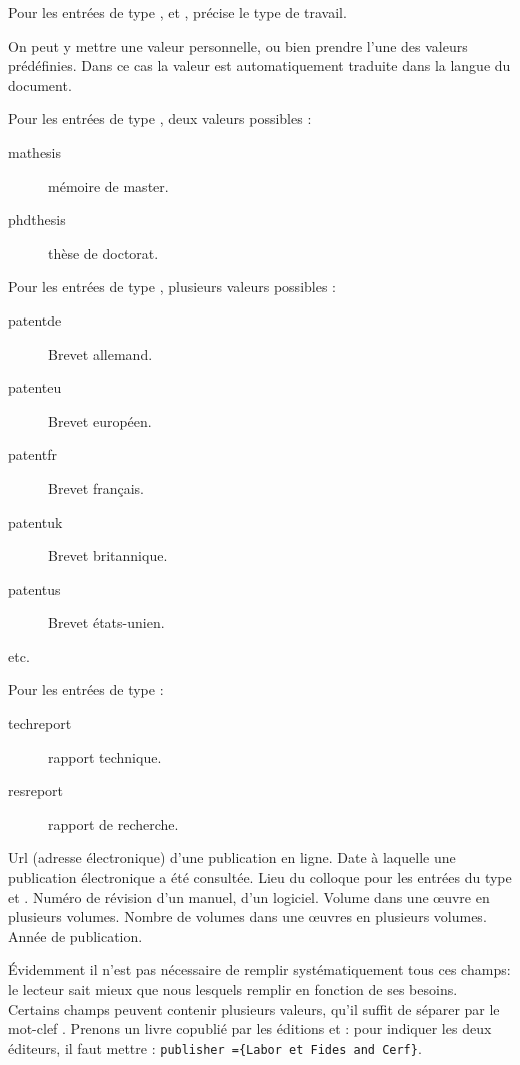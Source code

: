 \begin{fieldlist}
					
   	 Pour les entrées de type  ,  et , précise le type de travail.
	
	On peut y mettre une valeur personnelle, ou bien prendre l'une des valeurs prédéfinies. Dans ce cas la valeur est automatiquement traduite dans la langue du document.
	
	 Pour les entrées de type , deux valeurs possibles :
					\begin{description}
						\item[mathesis]mémoire de master.
						\item[phdthesis]thèse de doctorat.
					\end{description}
					
					 Pour les entrées de type , plusieurs  valeurs possibles : 
					 
					 
					 \begin{description}
						\item[patentde] Brevet allemand.
						\item[patenteu] Brevet européen.
						\item[patentfr] Brevet français.
						\item[patentuk] Brevet britannique.
						\item[patentus] Brevet états-unien.
						\item[etc.]
					 \end{description}
					
					Pour les entrées de type  : \nopagebreak
					\begin{description}
						\item[techreport]rapport technique.
						\item[resreport]rapport de recherche.
					\end{description}
					
	 Url (adresse électronique) d'une publication en ligne. 
   	 Date à laquelle une publication électronique a été consultée. 
   	 Lieu du colloque pour les entrées du type  et . 
   	 Numéro de révision d'un manuel, d'un logiciel. 
   	 Volume dans une œuvre en plusieurs volumes. 
   	 Nombre de volumes dans une œuvres en plusieurs volumes. 
   	 Année de publication. 				
\end{fieldlist}


Évidemment il n'est pas nécessaire de remplir  systématiquement tous ces champs: le lecteur sait mieux que nous lesquels remplir en fonction de ses besoins. Certains champs peuvent contenir plusieurs valeurs, qu'il suffit de séparer par le mot-clef . Prenons un livre copublié par les éditions  et  : pour indiquer les deux éditeurs, il faut mettre : \verb|publisher ={Labor et Fides and Cerf}|.




